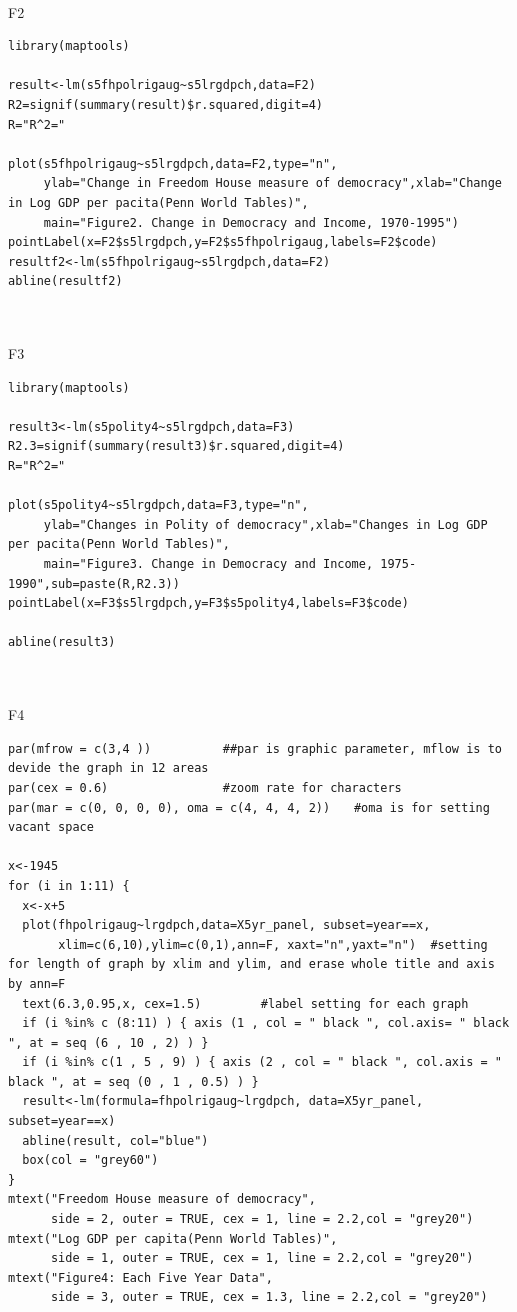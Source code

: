 \documentclass[a4paper,11pt]{article}
\begin{document}
\\
F2
\begin{lstlisting}
library(maptools)

result<-lm(s5fhpolrigaug~s5lrgdpch,data=F2)
R2=signif(summary(result)$r.squared,digit=4)
R="R^2="

plot(s5fhpolrigaug~s5lrgdpch,data=F2,type="n",
     ylab="Change in Freedom House measure of democracy",xlab="Change in Log GDP per pacita(Penn World Tables)",
     main="Figure2. Change in Democracy and Income, 1970-1995")
pointLabel(x=F2$s5lrgdpch,y=F2$s5fhpolrigaug,labels=F2$code)
resultf2<-lm(s5fhpolrigaug~s5lrgdpch,data=F2)
abline(resultf2)


\end{lstlisting}

\\
F3
\begin{lstlisting}
library(maptools)

result3<-lm(s5polity4~s5lrgdpch,data=F3)
R2.3=signif(summary(result3)$r.squared,digit=4)
R="R^2="

plot(s5polity4~s5lrgdpch,data=F3,type="n",
     ylab="Changes in Polity of democracy",xlab="Changes in Log GDP per pacita(Penn World Tables)",
     main="Figure3. Change in Democracy and Income, 1975-1990",sub=paste(R,R2.3))
pointLabel(x=F3$s5lrgdpch,y=F3$s5polity4,labels=F3$code)

abline(result3)


\end{lstlisting}

\\
F4
\begin{lstlisting}
par(mfrow = c(3,4 ))          ##par is graphic parameter, mflow is to devide the graph in 12 areas
par(cex = 0.6)                #zoom rate for characters
par(mar = c(0, 0, 0, 0), oma = c(4, 4, 4, 2))　　#oma is for setting vacant space

x<-1945
for (i in 1:11) {
  x<-x+5
  plot(fhpolrigaug~lrgdpch,data=X5yr_panel, subset=year==x,
       xlim=c(6,10),ylim=c(0,1),ann=F, xaxt="n",yaxt="n")  #setting for length of graph by xlim and ylim, and erase whole title and axis by ann=F
  text(6.3,0.95,x, cex=1.5)　　　　　#label setting for each graph
  if (i %in% c (8:11) ) { axis (1 , col = " black ", col.axis= " black ", at = seq (6 , 10 , 2) ) }
  if (i %in% c(1 , 5 , 9) ) { axis (2 , col = " black ", col.axis = " black ", at = seq (0 , 1 , 0.5) ) }
  result<-lm(formula=fhpolrigaug~lrgdpch, data=X5yr_panel, subset=year==x)
  abline(result, col="blue")
  box(col = "grey60")
}
mtext("Freedom House measure of democracy", 
      side = 2, outer = TRUE, cex = 1, line = 2.2,col = "grey20")
mtext("Log GDP per capita(Penn World Tables)", 
      side = 1, outer = TRUE, cex = 1, line = 2.2,col = "grey20")
mtext("Figure4: Each Five Year Data", 
      side = 3, outer = TRUE, cex = 1.3, line = 2.2,col = "grey20")

\end{lstlisting}
\end{document}
